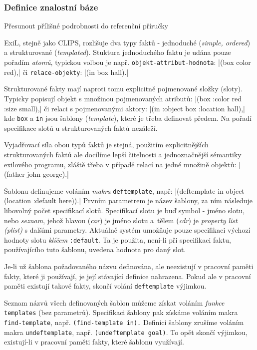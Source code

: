 \subsubsection{Definice znalostní báze}
\label{knowledge base definition}
\begin{framed}
Přesunout přílišné podrobnosti do referenční příručky
\end{framed}

ExiL, stejně jako CLIPS, rozlišuje dva typy faktů - jednoduché (\emph{simple,
ordered}) a strukturované (\emph{templated}). Stuktura jednoduchého faktu je udána
pouze pořadím \emph{atomů}, typickou volbou je např. \verb|objekt-attribut-hodnota|:
\cl|(box color red),| či \verb|relace-objekty|: \cl|(in box hall).|

Strukturované fakty mají naproti tomu explicitně pojmenované složky (sloty).
Typicky popisují objekt s množinou pojmenovaných atributů: \cl|(box :color red :size small),|
či relaci s pojmenovanými aktory: \cl|(in :object box :location hall),| kde
\verb|box| a \verb|in| jsou šablony (\emph{template}), které je třeba definovat
předem. Na pořadí specifikace slotů u strukturovaných faktů
nezáleží.

Vyjadřovací síla obou typů faktů je stejná, použitím explicitnějších
strukturovaných faktů ale docílíme lepší čitelnosti a jednoznačnější sémantiky
exilového programu, zláště třeba v případě relací na jedné množině objektů:
\cl|(father john george).|

Šablonu definujeme voláním \emph{makra} \verb|deftemplate|, např:
\cl|(deftemplate in object (location :default here)).| Prvním parametrem je
název šablony, za ním následuje libovolný počet specifikací slotů. Specifikací
slotu je buď symbol - jméno slotu, nebo \emph{seznam}, jehož hlavou
(\emph{car}) je jméno slotu a~tělem (\emph{cdr}) je \emph{property list (plist)}
s dalšími parametry. Aktuálně systém umožňuje pouze specifikaci výchozí hodnoty
slotu \emph{klíčem} \verb|:default|. Ta je použita, není-li při specifikaci
faktu, používajícího tuto šablonu, uvedena hodnota pro daný slot.

Je-li už šablona požadovaného názvu definována, ale neexistují v pracovní
paměti fakty, které ji používají, je její stávající definice nahrazena. Pokud
ale v pracovní paměti existují takové fakty, skončí volání \verb|deftemplate|
výjimkou.

Seznam názvů všech definovaných šablon můžeme získat voláním \emph{funkce}
\verb|templates| (bez parametrů). Specifikaci šablony pak získáme voláním makra
\verb|find-template|, např. \verb|(find-template in).| Definici šablony zrušíme
voláním makra \verb|undeftemplate|, např. \verb|(undeftemplate goal)|. To opět
skončí výjimkou, existují-li v pracovní paměti fakty, které šablonu využívají.

